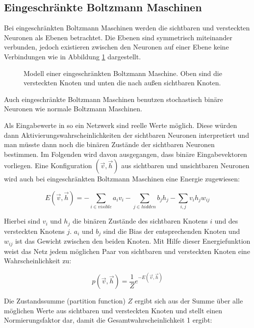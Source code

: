 \documentclass[12pt]{article}
\begin{document}
\subsection{Eingeschränkte Boltzmann Maschinen}	
Bei eingeschränkten Boltzmann Maschinen werden die sichtbaren und versteckten Neuronen als Ebenen betrachtet. Die Ebenen sind symmetrisch miteinander verbunden, jedoch existieren zwischen den Neuronen auf einer Ebene keine Verbindungen wie in Abbildung \ref{RBM} dargestellt.

\begin{figure}[H]
	\center
	
	\caption{Modell einer eingeschränkten Boltzmann Maschine. Oben sind die versteckten Knoten und unten die nach außen sichtbaren Knoten.}
	\label{RBM}
	\end{figure}
	
Auch eingeschränkte Boltzmann Maschinen benutzen stochastisch binäre Neuronen wie normale Boltzmann Maschinen.


Als Eingabewerte in so ein Netzwerk sind reelle Werte möglich. Diese würden dann Aktivierungswahrscheinlichkeiten der sichtbaren Neuronen interpretiert und man müsste dann noch die binären Zustände der sichtbaren Neuronen bestimmen. Im Folgenden wird davon ausgegangen, dass binäre Eingabevektoren vorliegen. 
Eine Konfiguration $(\vec{v},\vec{h})$ aus sichtbaren und unsichtbaren Neuronen wird auch bei eingeschränkten Boltzmann Maschinen eine Energie zugewiesen:

\begin{equation}
E(\vec{v},\vec{h})= - \sum_{i \in visible} a_iv_i- \sum_{j \in hidden} b_j h_j - \sum_{i,j} v_i h_j w_{ij}
\end{equation}

Hierbei sind $v_i$ und $h_j$ die binären Zustände des sichtbaren Knotens $i$ und des versteckten Knotens $j$. $a_i$ und $b_j$ sind die Bias der entsprechenden Knoten und $w_{ij}$ ist das Gewicht zwischen den beiden Knoten. Mit Hilfe dieser Energiefunktion weist das Netz jedem möglichen Paar von sichtbaren und versteckten Knoten eine Wahrscheinlichkeit zu:

\begin{equation}
p(\vec{v},\vec{h})= \frac{1}{Z} e^{-E(\vec{v},\vec{h})}
\end{equation}

Die Zustandssumme (partition function) $Z$ ergibt sich aus der Summe über alle möglichen Werte aus sichtbaren und versteckten Knoten und stellt einen Normierungsfaktor dar, damit die Gesamtwahrscheinlichkeit 1 ergibt:
\end{document}
